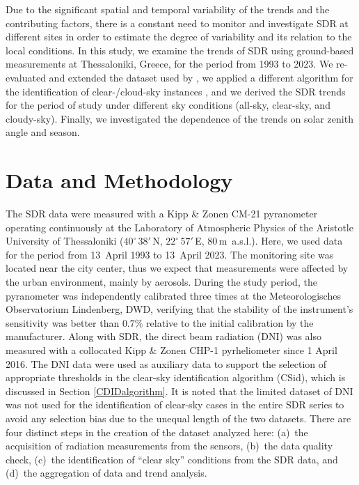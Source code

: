 \documentclass[applsci,article,submit,moreauthors,pdftex]{Definitions/mdpi}
\begin{document}
Due to the significant spatial and temporal variability of the trends
and the contributing factors, there is a constant need to monitor and
investigate SDR at different sites in order to estimate the degree of
variability and its relation to the local conditions. In this study, we
examine the trends of SDR using ground-based measurements at
Thessaloniki, Greece, for the period from 1993 to 2023. We re-evaluated
and extended the dataset used by \citet{Bais2013}, we applied a
different algorithm for the identification of clear-/cloud-sky instances
\citep{Reno2016, Reno2012}, and we derived the SDR trends for the period
of study under different sky conditions (all-sky, clear-sky, and
cloudy-sky). Finally, we investigated the dependence of the trends on
solar zenith angle and season.

\hypertarget{data-and-methodology}{%
\section{Data and Methodology}\label{data-and-methodology}}

The SDR data were measured with a Kipp \& Zonen CM-21 pyranometer
operating continuously at the Laboratory of Atmospheric Physics of the
Aristotle University of Thessaloniki (\(40^\circ\,38'\,\)N,
\(22^\circ\,57'\,\)E, \(80\,\)m~a.s.l.). Here, we used data for the
period from 13~April 1993 to 13~April 2023. The monitoring site was
located near the city center, thus we expect that measurements were
affected by the urban environment, mainly by aerosols. During the study
period, the pyranometer was independently calibrated three times at the
Meteorologisches Observatorium Lindenberg, DWD, verifying that the
stability of the instrument's sensitivity was better than \(0.7\%\)
relative to the initial calibration by the manufacturer. Along with SDR,
the direct beam radiation (DNI) was also measured with a collocated Kipp
\& Zonen CHP-1 pyrheliometer since 1 April 2016. The DNI data were used
as auxiliary data to support the selection of appropriate thresholds in
the clear-sky identification algorithm (CSid), which is discussed in
Section \ref{CDIDalgorithm}. It is noted that the limited dataset of DNI
was not used for the identification of clear-sky cases in the entire SDR
series to avoid any selection bias due to the unequal length of the two
datasets. There are four distinct steps in the creation of the dataset
analyzed here: (a)~the acquisition of radiation measurements from the
sensors, (b)~the data quality check, (c)~the identification of ``clear
sky'' conditions from the SDR data, and (d)~the aggregation of data and
trend analysis.
\end{document}
